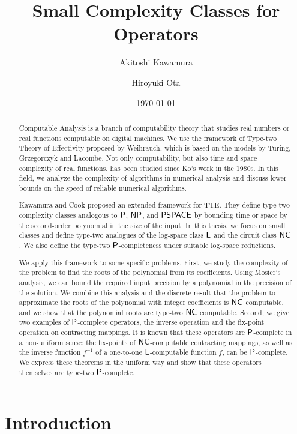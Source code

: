 \documentclass{article}
\title{Small Complexity Classes for Operators}
\author{Akitoshi Kawamura \and Hiroyuki Ota}
\date{\today}
\theoremstyle{definition}
\theoremstyle{remark}
\begin{document}
\maketitle
\begin{abstract}
Computable Analysis is a branch of computability theory that
studies real numbers or real functions computable on digital machines.
We use the framework of Type-two Theory of Effectivity proposed by Weihrauch,
which is based on the models by Turing, Grzegorczyk and Lacombe.
Not only computability, but also time and space complexity of real functions, 
has been studied since Ko's work in the 1980s. 
In this field,
we analyze the complexity of algorithms in numerical analysis 
and discuss lower bounds on the speed of reliable numerical algorithms.


Kawamura and Cook proposed an extended framework for TTE.
They define type-two complexity classes analogous to $\mathsf{P}$, $\mathsf{NP}$,
and $\mathsf{PSPACE}$ by bounding time or space by the second-order polynomial
in the size of the input.
In this thesis, we focus on small classes
and define type-two analogues of the log-space class $\mathsf{L}$ and
the circuit class $\mathsf{NC}$.
We also define the type-two $\mathsf{P}$-completeness under suitable log-space reductions.

We apply this framework to some specific problems.
First, we study the complexity of the problem to find the roots of
the polynomial from its coefficients.
Using Mosier's analysis, we can bound the required input precision 
by a polynomial in the precision of the solution.
We combine this analysis and the discrete result 
that the problem to approximate the roots of the polynomial with integer 
coefficients is $\mathsf{NC}$ computable,
and we show that the polynomial roots are type-two $\mathsf{NC}$ computable.
Second, we give two examples of $\mathsf{P}$-complete operators,
the inverse operation and the fix-point operation on contracting mappings.
It is known that these operators are $\mathsf{P}$-complete in a non-uniform sense:
the fix-points of $\mathsf{NC}$-computable contracting mappings,
as well as the inverse function $f^{-1}$ of a one-to-one $\mathsf{L}$-computable function $f$,
can be $\mathsf{P}$-complete.
We express these theorems in the uniform way and
show that these operators themselves are type-two $\mathsf{P}$-complete.
\end{abstract}

\section{Introduction}
\end{document}
